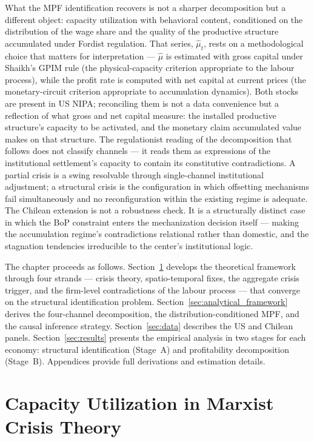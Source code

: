\documentclass[11pt,a4paper]{article}
\begin{document}
What the MPF identification recovers is not a sharper decomposition
but a different object: capacity utilization with behavioral content,
conditioned on the distribution of the wage share and the quality of
the productive structure accumulated under Fordist regulation. That
series, $\hat{\mu}_t$, rests on a methodological choice that matters
for interpretation --- $\hat{\mu}$ is estimated with gross capital
under Shaikh's GPIM rule (the physical-capacity criterion appropriate
to the labour process), while the profit rate is computed with net
capital at current prices (the monetary-circuit criterion appropriate
to accumulation dynamics). Both stocks are present in US NIPA;
reconciling them is not a data convenience but a reflection of what
gross and net capital measure: the installed productive structure's
capacity to be activated, and the monetary claim accumulated value
makes on that structure. The regulationist reading of the
decomposition that follows does not classify channels --- it reads
them as expressions of the institutional settlement's capacity to
contain its constitutive contradictions. A partial crisis is a swing
resolvable through single-channel institutional adjustment; a
structural crisis is the configuration in which offsetting mechanisms
fail simultaneously and no reconfiguration within the existing regime
is adequate. The Chilean extension is not a robustness check. It is
a structurally distinct case in which the BoP constraint enters the
mechanization decision itself --- making the accumulation regime's
contradictions relational rather than domestic, and the stagnation
tendencies irreducible to the center's institutional logic.

The chapter proceeds as follows. Section~\ref{sec:litreview} develops the theoretical framework through four strands --- crisis theory, spatio-temporal fixes, the aggregate crisis trigger, and the firm-level contradictions of the labour process --- that converge on the structural identification problem. Section~\ref{sec:analytical_framework} derives the four-channel decomposition, the distribution-conditioned MPF, and the causal inference strategy. Section~\ref{sec:data} describes the US and Chilean panels. Section~\ref{sec:results} presents the empirical analysis in two stages for each economy: structural identification
(Stage~A) and profitability decomposition (Stage~B). Appendices provide full derivations and estimation details.


\section{Capacity Utilization in Marxist Crisis Theory}
\label{sec:litreview}
\end{document}
